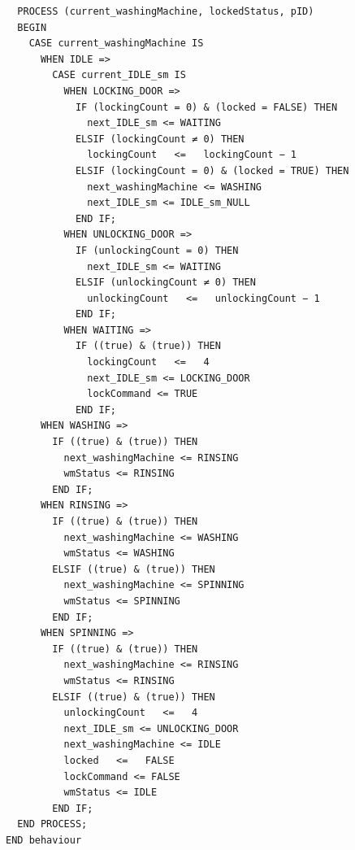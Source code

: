 \begin{verbatim}
  PROCESS (current_washingMachine, lockedStatus, pID)
  BEGIN
    CASE current_washingMachine IS 
      WHEN IDLE => 
        CASE current_IDLE_sm IS 
          WHEN LOCKING_DOOR => 
            IF (lockingCount = 0) & (locked = FALSE) THEN
              next_IDLE_sm <= WAITING
            ELSIF (lockingCount ≠ 0) THEN
              lockingCount   <=   lockingCount − 1
            ELSIF (lockingCount = 0) & (locked = TRUE) THEN
              next_washingMachine <= WASHING
              next_IDLE_sm <= IDLE_sm_NULL
            END IF;
          WHEN UNLOCKING_DOOR => 
            IF (unlockingCount = 0) THEN
              next_IDLE_sm <= WAITING
            ELSIF (unlockingCount ≠ 0) THEN
              unlockingCount   <=   unlockingCount − 1
            END IF;
          WHEN WAITING => 
            IF ((true) & (true)) THEN
              lockingCount   <=   4
              next_IDLE_sm <= LOCKING_DOOR
              lockCommand <= TRUE
            END IF;
      WHEN WASHING => 
        IF ((true) & (true)) THEN
          next_washingMachine <= RINSING
          wmStatus <= RINSING
        END IF;
      WHEN RINSING => 
        IF ((true) & (true)) THEN
          next_washingMachine <= WASHING
          wmStatus <= WASHING
        ELSIF ((true) & (true)) THEN
          next_washingMachine <= SPINNING
          wmStatus <= SPINNING
        END IF;
      WHEN SPINNING => 
        IF ((true) & (true)) THEN
          next_washingMachine <= RINSING
          wmStatus <= RINSING
        ELSIF ((true) & (true)) THEN
          unlockingCount   <=   4
          next_IDLE_sm <= UNLOCKING_DOOR
          next_washingMachine <= IDLE
          locked   <=   FALSE
          lockCommand <= FALSE
          wmStatus <= IDLE
        END IF;
  END PROCESS;
END behaviour
\end{verbatim}

